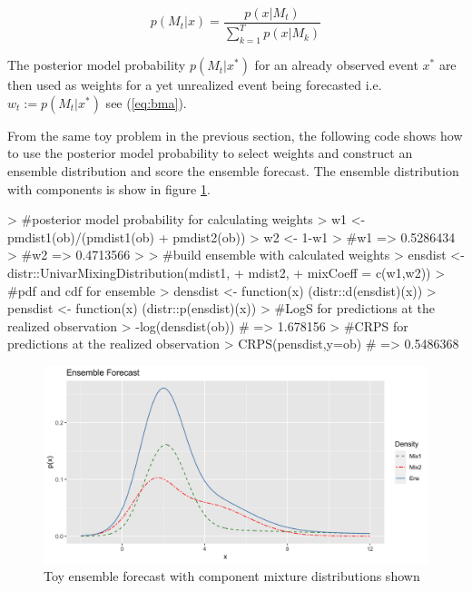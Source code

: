 \documentclass[11pt,notitlepage]{isuthesis}
\begin{document}
\begin{equation}
\label{eq:pmpeq}
p(M_t|x) =  \frac{p(x|M_t)}{\sum_{k=1}^Tp(x|M_k)}
\end{equation}

The posterior model probability $p(M_t|x^*)$ for an already observed event $x^*$
are then used as weights for a yet unrealized event being forecasted i.e.
$w_t := p(M_t|x^*)$ see (\ref{eq:bma}). 

From the same toy problem in the previous section, the following code shows how
to use the posterior model probability to select weights and construct an 
ensemble distribution and score the ensemble forecast. The ensemble distribution
with components is show in figure \ref{fig:mixense}.

\begin{Schunk}
\begin{Sinput}
> #posterior model probability for calculating weights
> w1 <- pmdist1(ob)/(pmdist1(ob) + pmdist2(ob))
> w2 <- 1-w1
> #w1 => 0.5286434
> #w2 => 0.4713566
> 
> #build ensemble with calculated weights
> ensdist <- distr::UnivarMixingDistribution(mdist1,
+                                            mdist2,
+                                            mixCoeff = c(w1,w2))
> #pdf and cdf for ensemble
> densdist <- function(x) {(distr::d(ensdist)(x))}
> pensdist <- function(x) {(distr::p(ensdist)(x))}
> #LogS for predictions at the realized observation
> -log(densdist(ob)) # => 1.678156
> #CRPS for predictions at the realized observation
> CRPS(pensdist,y=ob) # => 0.5486368
\end{Sinput}
\end{Schunk}


\begin{figure}[htbp]
\centerline{\includegraphics[scale=.15]{Images/mix_ense.png}}
\caption[Toy ensemble forecast]{Toy ensemble forecast with component mixture
distributions shown}
\label{fig:mixense}
\end{figure}
\end{document}
